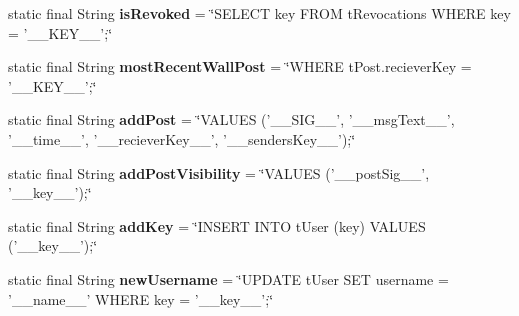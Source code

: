 \begin{DoxyCompactItemize}
\item 
\hypertarget{classballmerpeak_1_1turtlenet_1_1server_1_1DBStrings_a18c48137c57f21cff5ba853fbf5f524f}{static final String {\bfseries is\-Revoked} = \char`\"{}S\-E\-L\-E\-C\-T key F\-R\-O\-M t\-Revocations W\-H\-E\-R\-E key = '\-\_\-\-\_\-\-K\-E\-Y\-\_\-\-\_\-';\char`\"{}}\label{classballmerpeak_1_1turtlenet_1_1server_1_1DBStrings_a18c48137c57f21cff5ba853fbf5f524f}

\item 
\hypertarget{classballmerpeak_1_1turtlenet_1_1server_1_1DBStrings_ad9c0536856622b589ca1c0877681c86c}{static final String {\bfseries most\-Recent\-Wall\-Post} = \char`\"{}W\-H\-E\-R\-E t\-Post.\-reciever\-Key = '\-\_\-\-\_\-\-K\-E\-Y\-\_\-\-\_\-';\char`\"{}}\label{classballmerpeak_1_1turtlenet_1_1server_1_1DBStrings_ad9c0536856622b589ca1c0877681c86c}

\item 
\hypertarget{classballmerpeak_1_1turtlenet_1_1server_1_1DBStrings_a0fa383a5ec1519c387372722ee41a7fe}{static final String {\bfseries add\-Post} = \char`\"{}V\-A\-L\-U\-E\-S ('\-\_\-\-\_\-\-S\-I\-G\-\_\-\-\_\-', '\-\_\-\-\_\-msg\-Text\-\_\-\-\_\-', '\-\_\-\-\_\-time\-\_\-\-\_\-', '\-\_\-\-\_\-reciever\-Key\-\_\-\-\_\-', '\-\_\-\-\_\-senders\-Key\-\_\-\-\_\-');\char`\"{}}\label{classballmerpeak_1_1turtlenet_1_1server_1_1DBStrings_a0fa383a5ec1519c387372722ee41a7fe}

\item 
\hypertarget{classballmerpeak_1_1turtlenet_1_1server_1_1DBStrings_a3a96505a04038ec4631bbeeb7aa64f4d}{static final String {\bfseries add\-Post\-Visibility} = \char`\"{}V\-A\-L\-U\-E\-S ('\-\_\-\-\_\-post\-Sig\-\_\-\-\_\-', '\-\_\-\-\_\-key\-\_\-\-\_\-');\char`\"{}}\label{classballmerpeak_1_1turtlenet_1_1server_1_1DBStrings_a3a96505a04038ec4631bbeeb7aa64f4d}

\item 
\hypertarget{classballmerpeak_1_1turtlenet_1_1server_1_1DBStrings_a411c712ba8bd368765dfd890abca6106}{static final String {\bfseries add\-Key} = \char`\"{}I\-N\-S\-E\-R\-T I\-N\-T\-O t\-User (key) V\-A\-L\-U\-E\-S ('\-\_\-\-\_\-key\-\_\-\-\_\-');\char`\"{}}\label{classballmerpeak_1_1turtlenet_1_1server_1_1DBStrings_a411c712ba8bd368765dfd890abca6106}

\item 
\hypertarget{classballmerpeak_1_1turtlenet_1_1server_1_1DBStrings_a9561d2bc731daafe8e20cb46dc51cfb6}{static final String {\bfseries new\-Username} = \char`\"{}U\-P\-D\-A\-T\-E t\-User S\-E\-T username = '\-\_\-\-\_\-name\-\_\-\-\_\-' W\-H\-E\-R\-E key = '\-\_\-\-\_\-key\-\_\-\-\_\-';\char`\"{}}\label{classballmerpeak_1_1turtlenet_1_1server_1_1DBStrings_a9561d2bc731daafe8e20cb46dc51cfb6}


\end{DoxyCompactItemize}

